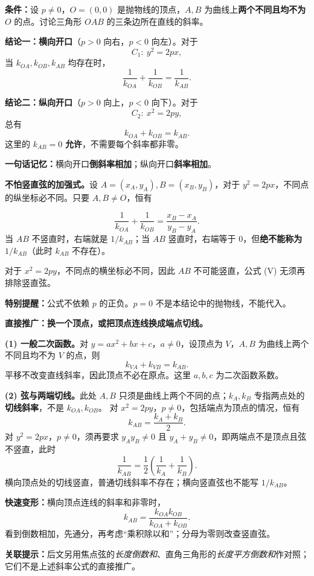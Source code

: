\begin{statementbox}
\textbf{条件：}设 $p\ne0$，$O=(0,0)$ 是抛物线的顶点，$A,B$ 为曲线上\textbf{两个不同且均不为 $O$} 的点。讨论三角形 $OAB$ 的三条边所在直线的斜率。

\begin{center}

\end{center}

\textbf{结论一：横向开口}（$p>0$ 向右，$p<0$ 向左）。对于
\[
C_1:\ y^2=2px,
\]
当 $k_{OA},k_{OB},k_{AB}$ 均存在时，
\[
\boxed{\frac1{k_{OA}}+\frac1{k_{OB}}=\frac1{k_{AB}}}.
\tag{H}
\]

\textbf{结论二：纵向开口}（$p>0$ 向上，$p<0$ 向下）。对于
\[
C_2:\ x^2=2py,
\]
总有
\[
\boxed{k_{OA}+k_{OB}=k_{AB}}.
\tag{V}
\]
这里的 $k_{AB}=0$ \textbf{允许}，不需要每个斜率都非零。

\textbf{一句话记忆：}横向开口\textbf{倒斜率相加}；纵向开口\textbf{斜率相加}。
\end{statementbox}

\clearpage
\begin{statementbox}
\textbf{不怕竖直弦的加强式。}设 $A=(x_A,y_A),B=(x_B,y_B)$，对于 $y^2=2px$，不同点的纵坐标必不同。只要 $A,B\ne O$，恒有
\begin{center}\end{center}
\[
\boxed{\frac1{k_{OA}}+\frac1{k_{OB}}=\frac{x_B-x_A}{y_B-y_A}}.
\tag{H$^*$}
\]
当 $AB$ 不竖直时，右端就是 $1/k_{AB}$；当 $AB$ 竖直时，右端等于 $0$，但\textbf{绝不能称为 $1/k_{AB}$}（此时 $k_{AB}$ 不存在）。

对于 $x^2=2py$，不同点的横坐标必不同，因此 $AB$ 不可能竖直，公式 (V) 无须再排除竖直弦。

\textbf{特别提醒：}公式不依赖 $p$ 的正负。$p=0$ 不是本结论中的抛物线，不能代入。
\end{statementbox}

\clearpage
\begin{statementbox}
\textbf{直接推广：换一个顶点，或把顶点连线换成端点切线。}

\textbf{(1) 一般二次函数。}对 $y=ax^2+bx+c$，$a\ne0$，设顶点为 $V$，$A,B$ 为曲线上两个不同且均不为 $V$ 的点，则
\[
\boxed{k_{VA}+k_{VB}=k_{AB}}.
\]
平移不改变直线斜率，因此顶点不必在原点。这里 $a,b,c$ 为二次函数系数。

\medskip
\textbf{(2) 弦与两端切线。}此处 $A,B$ 只须是曲线上两个不同的点；$k_A,k_B$ 专指两点处的\textbf{切线斜率}，不是 $k_{OA},k_{OB}$。
对 $x^2=2py$，$p\ne0$，包括端点为顶点的情况，恒有
\[
\boxed{k_{AB}=\frac{k_A+k_B}{2}}.
\]
对 $y^2=2px$，$p\ne0$，须再要求 $y_Ay_B\ne0$ 且 $y_A+y_B\ne0$，即两端点不是顶点且弦不竖直，此时
\[
\boxed{\frac1{k_{AB}}=\frac12\left(\frac1{k_A}+\frac1{k_B}\right)}.
\]
横向顶点处的切线竖直，普通切线斜率不存在；横向竖直弦也不能写 $1/k_{AB}$。

\medskip
\textbf{快速变形：}横向顶点连线的斜率和非零时，
\[
\boxed{k_{AB}=\frac{k_{OA}k_{OB}}{k_{OA}+k_{OB}}}.
\]
看到倒数相加，先通分，再考虑“乘积除以和”；分母为零则改查竖直弦。

\textbf{关联提示：}后文另用焦点弦的\emph{长度倒数和}、直角三角形的\emph{长度平方倒数和}作对照；它们不是上述斜率公式的直接推广。
\end{statementbox}
